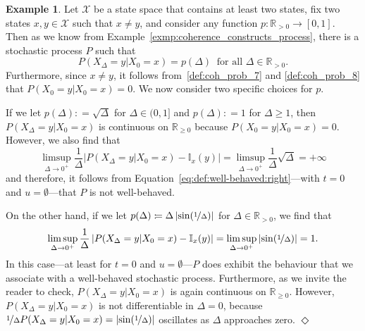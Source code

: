 \documentclass[10pt,a4paper]{paper}
\theoremstyle{definition}
\newtheorem{exmp}{Example}%
\newcommand{\reals}{\mathbb{R}}
\newcommand{\realspos}{\reals_{>0}}
\newcommand{\states}{\mathcal{X}}
\newcommand{\ind}[1]{\mathbb{I}_{#1}}
\newcommand{\abs}[1]{\left\vert #1 \right\vert}
\newcommand{\coloneqq}{:\!=}
\newcommand{\exampleend}{\hfill$\Diamond$}
\begin{document}






\begin{exmp}\label{exmp:well-behaved}
Let $\states$ be a state space that contains at least two states, fix two states $x,y\in\states$ such that $x\neq y$, and consider any function $p:\reals_{>0}\to[0,1]$. Then as we know from Example~\ref{exmp:coherence_constructs_process}, there is a stochastic process $P$ such that
\begin{equation*}
P(X_\Delta=y\vert X_0=x)=p(\Delta)
~\text{ for all $\Delta\in\realspos$.}
\end{equation*}
Furthermore, since $x\neq y$, it follows from~\ref{def:coh_prob_7} and \ref{def:coh_prob_8} that $P(X_0=y\vert X_0=x)=0$. We now consider two specific choices for $p$.

If we let $p(\Delta)\coloneqq\sqrt\Delta$ for $\Delta\in(0,1]$ and $p(\Delta)\coloneqq 1$ for $\Delta\geq1$, then $P(X_\Delta=y\vert X_0=x)$ is continuous on $\reals_{\geq0}$ because $P(X_0=y\vert X_0=x)=0$. However, we also find that
\begin{equation*}
\limsup_{\Delta\to0^+}\frac{1}{\Delta}\abs{P(X_{\Delta}=y\vert X_{0}=x) - \ind{x}(y)}
=
\limsup_{\Delta\to0^+}\frac{1}{\Delta}\sqrt\Delta
=+\infty
\end{equation*}
and therefore, it follows from Equation~\eqref{eq:def:well-behaved:right}---with $t=0$ and $u=\emptyset$---that $P$ is not well-behaved.

On the other hand, if we let $p(\Delta)\coloneqq \Delta\abs{\sin(\nicefrac{1}{\Delta})}$ for $\Delta\in\realspos$, we find that
\begin{equation*}
\limsup_{\Delta\to0^+}\frac{1}{\Delta}\abs{P(X_{\Delta}=y\vert X_{0}=x) - \ind{x}(y)}
=
\limsup_{\Delta\to0^+}\abs{\sin(\nicefrac{1}{\Delta})}
=1.
\end{equation*}
In this case---at least for $t=0$ and $u=\emptyset$---$P$ does exhibit the behaviour that we associate with a well-behaved stochastic process. Furthermore, as we invite the reader to check, $P(X_\Delta=y\vert X_0=x)$ is again continuous on $\reals_{\geq0}$. However, $P(X_\Delta=y\vert X_0=x)$ is not differentiable in $\Delta=0$, because $\nicefrac{1}{\Delta}P(X_\Delta=y\vert X_0=x)=\abs{\sin(\nicefrac{1}{\Delta})}$ oscillates as $\Delta$ approaches zero.
\exampleend
\end{exmp}
\end{document}
